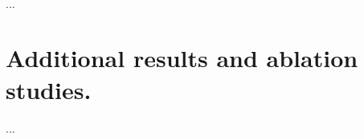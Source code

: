 \documentclass{article}
\begin{document}
\paragraph{} ...

\section{Additional results and ablation studies.}

\paragraph{} ...

\begin{table}[h]
  \centering
  \caption{The $\Pcont$ and $\Ptr$ duality \textbf{does not} hold. The instance-wise vs distribution-wise duality \textbf{does} hold. SAE quality on \textbf{synthetic DGP} under different regularisation regimes.}
  \label{tab:translation_vs_concept_consistency_synthetic}
\end{table}
\end{document}
